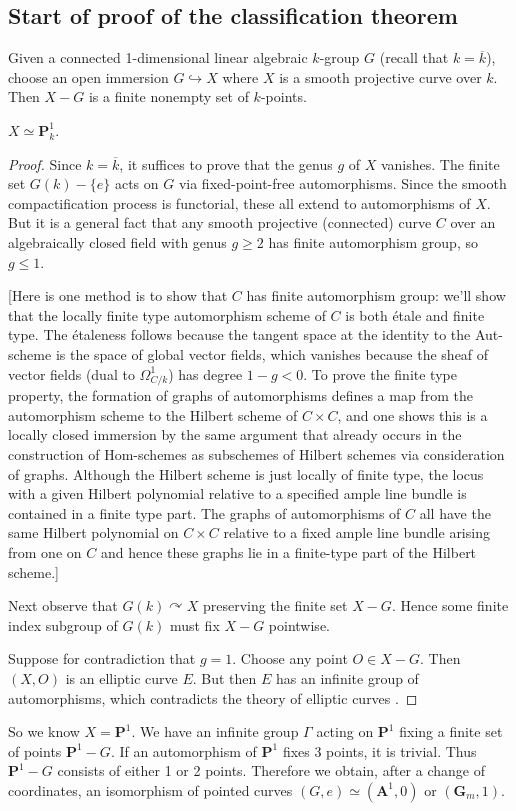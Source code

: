\documentclass[10pt]{article}
\renewcommand{\AA}{\mathbf{A}}
\newcommand{\PP}{\mathbf{P}}
\renewcommand{\(}{\left(}
\renewcommand{\)}{\right)}
\renewcommand{\bar}{\overline}
\newcommand{\actson}{\curvearrowright}
\newcommand{\into}{\hookrightarrow}
\numberwithin{thm}{subsection}
\begin{document}
\subsection{Start of proof of the classification theorem}
Given a connected 1-dimensional linear algebraic $k$-group $G$
(recall that $k=\bar k$), choose an open immersion
$G\into X$ where $X$ is a smooth projective curve over $k$.
Then $X-G$ is a finite nonempty set of $k$-points.
\begin{claim}$X\simeq \PP^1_k$.
\end{claim}
\begin{proof}
Since $k=\bar k$, it suffices to prove that the genus $g$ of $X$ vanishes. 
The finite set $G(k)-\{e\}$ acts on $G$ via fixed-point-free automorphisms.
Since the smooth compactification process is functorial, these all extend to automorphisms of $X$.
But it is a general fact that any smooth projective (connected)
curve $C$ over an algebraically closed field with genus $g\geq 2$
has finite automorphism group, so $g \leq 1$.  

[Here is one method is to show that $C$ has finite automorphism group: we'll show that the locally
finite type automorphism scheme
of $C$ is both \'etale and finite type.  The \'etaleness follows because
the tangent space at the identity to the Aut-scheme is the space of global vector
fields, which vanishes because the sheaf of vector fields (dual to $\Omega^1_{C/k}$) has
degree $1-g < 0$.
To prove the finite type property, the formation of graphs of automorphisms defines a map from
the automorphism scheme to the Hilbert scheme of $C\times C$, and one shows
this is a locally closed immersion by the same argument that already occurs
in the construction of Hom-schemes as subschemes of Hilbert schemes via consideration of graphs.
Although the Hilbert scheme is just locally of finite type, the locus with
a given Hilbert polynomial relative to a specified ample line bundle is contained in a finite type
part.  The graphs of automorphisms  of $C$ all have the same Hilbert polynomial 
on $C \times C$ relative to a fixed ample line bundle arising from one on $C$ and hence
these graphs lie in a finite-type part of the Hilbert scheme.]

Next observe that $G(k)\actson X$ preserving the finite set $X-G$.
Hence some finite index subgroup of $G(k)$ must fix $X-G$ pointwise. 

Suppose for contradiction that $g=1$. Choose any point $O\in X-G$.
Then $(X,O)$ is an elliptic curve $E$.
But then $E$ has an infinite group of automorphisms,
which contradicts the theory of elliptic curves \cite[Thm.\,III.10.1]{aec1}. 
\end{proof}
So we know $X=\PP^1$.
We have an infinite group $\Gamma$ acting on $\PP^1$ fixing
a finite set of points $\PP^1-G$.
If an automorphism of $\PP^1$ fixes 3 points, it is trivial.
Thus $\PP^1-G$ consists of either 1 or 2 points.
Therefore we obtain, after a change of coordinates, an isomorphism
of pointed curves
$(G,e)\simeq (\AA^1,0)$ or $(\mathbf{G}_m,1)$.
\end{document}
